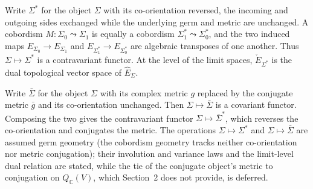 \begin{definition}
  \label{def:dual-conjugate-functors}
  \notready
  Write $\Sigma^*$ for the object $\Sigma$ with its co-orientation reversed, the
  incoming and outgoing sides exchanged while the underlying germ and metric are
  unchanged. A cobordism $M \colon \Sigma_0 \leadsto \Sigma_1$ is equally a
  cobordism $\Sigma_1^* \leadsto \Sigma_0^*$, and the two induced maps
  $E_{\Sigma_0} \to E_{\Sigma_1}$ and $E_{\Sigma_1^*} \to E_{\Sigma_0^*}$ are
  algebraic transposes of one another. Thus $\Sigma \mapsto \Sigma^*$ is a
  contravariant functor. At the level of the limit spaces,
  $\check E_{\Sigma^*}$ is the dual topological vector space of $\hat E_{\Sigma}$.

  Write $\bar\Sigma$ for the object $\Sigma$ with its complex metric $g$ replaced
  by the conjugate metric $\bar g$ and its co-orientation unchanged. Then
  $\Sigma \mapsto \bar\Sigma$ is a covariant functor. Composing the two gives the
  contravariant functor $\Sigma \mapsto \bar\Sigma^*$, which reverses the
  co-orientation and conjugates the metric. The operations
  $\Sigma \mapsto \Sigma^*$ and $\Sigma \mapsto \bar\Sigma$ are assumed germ
  geometry (the cobordism geometry tracks neither co-orientation nor metric
  conjugation); their involution and variance laws and the limit-level dual
  relation are stated, while the tie of the conjugate object's metric to
  conjugation on $Q_{\mathbb C}(V)$, which Section~2 does not provide, is
  deferred.
\end{definition}

